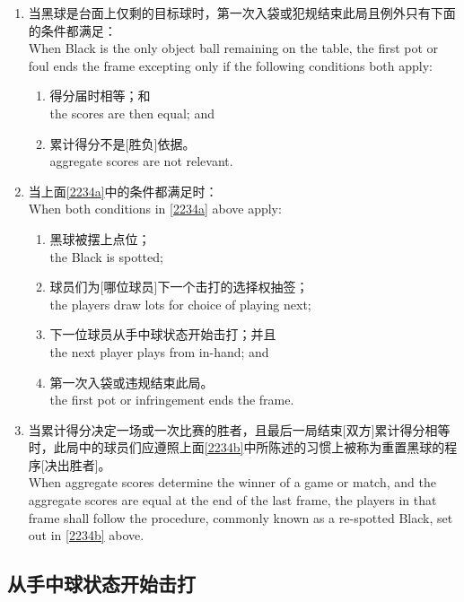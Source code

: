 \begin{enumerate}[label=(\alph*)]
    \item \label{2234a}当黑球是台面上仅剩的目标球时，第一次入袋或犯规结束此局且例外只有下面的条件都满足：\\
    When Black is the only object ball remaining on the table, the first pot or foul ends the frame excepting only if the following conditions both apply:
    \begin{enumerate}[label=(\roman*)]
        \item 得分届时相等；和\\
        the scores are then equal; and
        \item 累计得分不是[胜负]依据。\\
        aggregate scores are not relevant.
    \end{enumerate}
    \item \label{2234b}当上面\ref{2234a}中的条件都满足时：\\
    When both conditions in \ref{2234a} above apply:
    \begin{enumerate}[label=(\roman*)]
        \item 黑球被摆上点位；\\
        the Black is spotted;
        \item 球员们为[哪位球员]下一个击打的选择权抽签；\\
        the players draw lots for choice of playing next;
        \item 下一位球员从手中球状态开始击打；并且\\
        the next player plays from in-hand; and
        \item 第一次入袋或违规结束此局。\\
        the first pot or infringement ends the frame.
    \end{enumerate}
    \item 当累计得分决定一场或一次比赛的胜者，且最后一局结束[双方]累计得分相等时，此局中的球员们应遵照上面\ref{2234b}中所陈述的习惯上被称为重置黑球的程序[决出胜者]。\\
    When aggregate scores determine the winner of a game or match, and the aggregate scores are equal at the end of the last frame, the players in that frame shall follow the procedure, commonly known as a re-spotted Black, set out in \ref{2234b} above.
\end{enumerate}

\subsection{从手中球状态开始击打}

